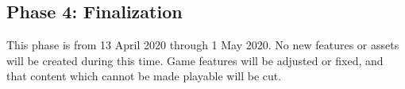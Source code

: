 \documentclass[titlepage]{article}
\begin{document}
\subsection*{Phase 4: Finalization}

This phase is from 13 April 2020 through 1 May 2020. No new features or assets
will be created during this time. Game features will be adjusted or fixed, and
that content which cannot be made playable will be cut.

\end{document}
